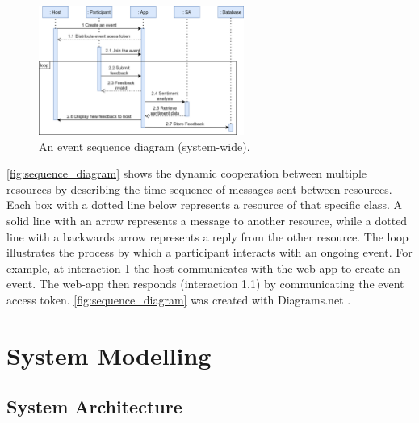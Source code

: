 \documentclass[9pt, titlepage]{extarticle}
\begin{document}
\begin{figure}
\centering
\includegraphics[width=0.6\textwidth]{assets/event-sequence.png}
\caption{An event sequence diagram (system-wide).}
\label{fig:sequence_diagram}
\end{figure}

\autoref{fig:sequence_diagram} shows the dynamic cooperation between multiple resources by describing the time sequence of messages sent between resources. Each box with a dotted line below represents a resource of that specific class. A solid line with an arrow represents a message to another resource, while a dotted line with a backwards arrow represents a reply from the other resource. The loop illustrates the process by which a participant interacts with an ongoing event. For example, at interaction 1 the host communicates with the web-app to create an event. The web-app then responds (interaction 1.1) by communicating the event access token. \autoref{fig:sequence_diagram} was created with Diagrams.net \autocite{web:drawio}.
\vspace{11mm}

\section{System Modelling}

\subsection{System Architecture}
\end{document}
